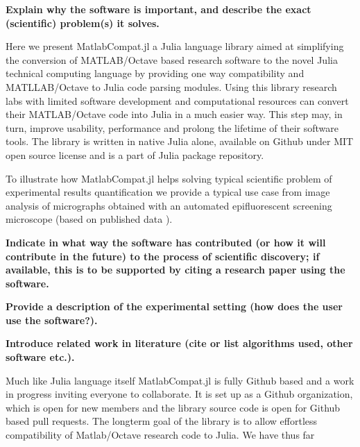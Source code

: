 \textbf{Explain why the software is important, and describe the exact (scientific) problem(s) it solves.}

Here we present MatlabCompat.jl a Julia language library aimed at simplifying the conversion of MATLAB/Octave based research software to the novel Julia technical computing language by providing one way compatibility and MATLLAB/Octave to Julia code parsing modules. Using this library research labs with limited software development and computational resources can convert their MATLAB/Octave code into Julia in a much easier way. This step may, in turn, improve usability, performance and prolong the lifetime of their software tools. The library is written in native Julia alone, available on Github under MIT open source license and is a part of Julia package repository.

To illustrate how MatlabCompat.jl helps solving typical scientific problem of experimental results quantification we provide a typical use case from image analysis of micrographs obtained with an automated epifluorescent screening microscope (based on published data \cite{22787215}).

\textbf{Indicate in what way the software has contributed (or how it will contribute in the future) to the process of scientific discovery; if available, this is to be supported by citing a research paper using the software.}


\textbf{Provide a description of the experimental setting (how does the user use the software?).}


\textbf{Introduce related work in literature (cite or list algorithms used, other software etc.).}

Much like Julia language itself MatlabCompat.jl is fully Github based and a work in progress inviting everyone to collaborate. It is set up as a Github organization, which is open for new members and the library source code is open for Github based pull requests. The longterm goal of the library is to allow effortless compatibility of Matlab/Octave research code to Julia. We have thus far
    
    
    
    
    
    
    
    
    
    
    
    
    
    
    
    
    
  
  
  